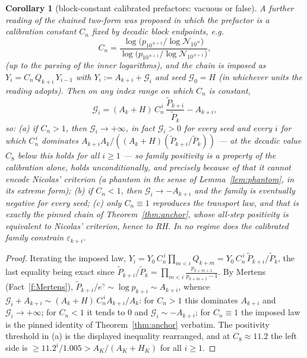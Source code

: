 \documentclass[11pt]{article}
\newtheorem{corollary}[theorem]{Corollary}
\theoremstyle{remark}
\newcommand{\eps}{\varepsilon}
\newcommand{\Ptil}{\widetilde P}
\newcommand{\gam}{\gamma}
\begin{document}
\begin{corollary}[block-constant calibrated prefactors: vacuous or false]
\label{cor:calib}
A further reading of the chained two-form was proposed in which the
prefactor is a calibration constant $C_n$ fixed by decadic block
endpoints, e.g.
\[
C_n=\frac{\log\bigl(p_{10^{\,n+1}}/\log\mathcal N_{10^{\,n}}\bigr)}
         {\log\bigl(p_{10^{\,n+1}}/\log\mathcal N_{10^{\,n+1}}\bigr)},
\]
(up to the parsing of the inner logarithms), and the chain is imposed as
$Y_i=C_n\,Q_{k+i}\,Y_{i-1}$ with $Y_i:=A_{k+i}+\mathcal G_i$ and seed
$\mathcal G_0=H$ (in whichever units the reading adopts). Then on any
index range on which $C_n$ is constant,
\[
\mathcal G_i=(A_k+H)\,C_n^{\,i}\,\frac{\Ptil_{k+i}}{\Ptil_k}-A_{k+i},
\]
so: (a) if $C_n>1$, then $\mathcal G_i\to+\infty$, in fact
$\mathcal G_i>0$ for \emph{every seed and every} $i$ for which
$C_n^{\,i}$ dominates $A_{k+i}A_k/((A_k+H)(\Ptil_{k+i}/\Ptil_k))$ ---
at the decadic value $C_8$ below this holds for all $i\ge1$ ---
so family positivity is a property of the calibration alone, holds
\emph{unconditionally}, and precisely because of that it cannot encode
Nicolas' criterion (a phantom in the sense of Lemma~\ref{lem:phantom},
in its extreme form); (b) if $C_n<1$, then $\mathcal G_i\to-A_{k+i}$ and
the family is eventually negative for every seed; (c) only
$C_n\equiv1$ reproduces the transport law, and that is exactly the
pinned chain of Theorem~\ref{thm:anchor}, whose all-step positivity is
equivalent to Nicolas' criterion, hence to RH. In no regime does the
calibrated family constrain $\eps_{k+i}$.
\end{corollary}

\begin{proof}
Iterating the imposed law,
$Y_i=Y_0\,C_n^{\,i}\prod_{m<i}Q_{k+m}
=Y_0\,C_n^{\,i}\,\Ptil_{k+i}/\Ptil_k$, the last equality being exact since
$\Ptil_{k+i}/\Ptil_k=\prod_{m<i}\frac{p_{k+m+1}}{p_{k+m+1}-1}$. By
Mertens (Fact~\ref{f:Mertens}),
$\Ptil_{k+i}/e^\gam\sim\log p_{k+i}\sim A_{k+i}$, whence
$\mathcal G_i+A_{k+i}\sim(A_k+H)\,C_n^{\,i}A_{k+i}/A_k$: for $C_n>1$ this
dominates $A_{k+i}$ and $\mathcal G_i\to+\infty$; for $C_n<1$ it tends
to $0$ and $\mathcal G_i\sim-A_{k+i}$; for $C_n\equiv1$ the imposed law
is the pinned identity of Theorem~\ref{thm:anchor} verbatim. The
 positivity threshold in (a) is the displayed inequality rearranged, and
at $C_8\approx11.2$ the left side is $\ge11.2^i/1.005>A_K/(A_K+H_K)$
for all $i\ge1$.
\end{proof}
\end{document}
